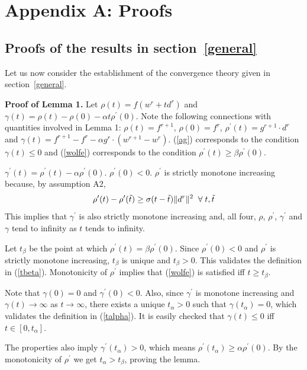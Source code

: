 \section{Appendix A: Proofs}
\label{proofs}

\subsection{Proofs of the results in section~\ref{general}}

Let us now consider the establishment of the convergence theory given in section~\ref{general}.

{\bf Proof of Lemma 1.}
Let $\rho(t)=f(w^r+td^r)$ and $\gamma(t)=\rho(t)-\rho(0)-\alpha t\rho^\prime(0)$.
Note the following connections with quantities involved in Lemma 1: $\rho(t)=f^{r+1}$, $\rho(0)=f^r$, $\rho^\prime(t)=g^{r+1}\cdot d^r$ and $\gamma(t)=f^{r+1} - f^r - \alpha g^r\cdot(w^{r+1}-w^r)$.
(\ref{ag}) corresponds to the condition $\gamma(t)\le 0$ and (\ref{wolfe}) corresponds to the condition $\rho^\prime(t)\ge \beta\rho^\prime(0)$.

$\gamma^\prime(t) = \rho^\prime(t)-\alpha \rho^\prime(0)$.
$\rho^\prime(0)<0$.
$\rho^\prime$ is strictly monotone increasing because, by assumption A2,
\begin{equation}
\rho^\prime(t)-\rho^\prime(\tilde{t}) \ge \sigma (t-\tilde{t})\|d^r\|^2 \;\; \forall \; t, \tilde{t}
\label{prop11}
\end{equation}
This implies that $\gamma^\prime$ is also strictly monotone increasing and, all four, $\rho$, $\rho^\prime$, $\gamma^\prime$ and $\gamma$ tend to infinity as $t$ tends to infinity.

Let $t_\beta$ be the point at which $\rho^\prime(t)=\beta\rho^\prime(0)$. Since $\rho^\prime(0)<0$ and $\rho^\prime$ is strictly monotone increasing, $t_\beta$ is unique and $t_\beta>0$. This validates the definition in (\ref{tbeta}). Monotonicity of $\rho^\prime$ implies that (\ref{wolfe}) is satisfied iff $t\ge t_\beta$.

Note that $\gamma(0)=0$ and $\gamma^\prime(0)<0$. Also, since $\gamma^\prime$ is monotone increasing and $\gamma(t)\to\infty$ as $t\to\infty$, there exists a unique $t_\alpha>0$ such that $\gamma(t_\alpha)=0$, which validates the definition in (\ref{talpha}). It is easily checked that $\gamma(t)\le 0$ iff $t\in [0,t_\alpha]$.

The properties also imply $\gamma^\prime(t_\alpha)> 0$, which means $\rho^\prime(t_\alpha) \ge \alpha\rho^\prime(0)$. By the monotonicity of $\rho^\prime$ we get $t_\alpha>t_\beta$, proving the lemma.


